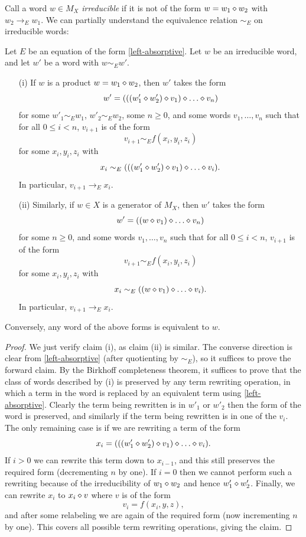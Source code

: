 Call a word $w \in M_X$ \emph{irreducible} if it is not of the form $w = w_1 \diamond w_2$ with $w_2 \to_E w_1$.  We can partially understand the equivalence relation $\sim_E$ on irreducible words:

\begin{theorem}\label{irred-desc}  Let $E$ be an equation of the form \eqref{left-absorptive}.  Let $w$ be an irreducible word, and let $w'$ be a word with $w \sim_E w'$.
  \begin{itemize}
    \item[(i)] If $w$ is a product $w = w_1 \diamond w_2$, then $w'$ takes the form
$$ w' = (((w'_1 \op w'_2) \op v_1) \op \dots \op v_n)$$
for some $w'_1 \sim_E w_1$, $w'_2 \sim_E w_2$, some $n \geq 0$, and some words $v_1, \dots, v_n$ such that for all $0 \leq i < n$, $v_{i+1}$ is of the form
$$ v_{i+1} \sim_E f(x_i,y_i,z_i)$$
for some $x_i, y_i, z_i$ with
$$ x_i \sim_E (((w'_1 \op w'_2) \op v_1) \op \dots \op v_i).$$
In particular, $v_{i+1} \to_E x_i$.
  \item[(ii)] Similarly, if $w \in X$ is a generator of $M_X$, then $w'$ takes the form
$$ w' = ((w \op v_1) \op \dots \op v_n)$$
for some $n \geq 0$, and some words $v_1, \dots, v_n$ such that for all $0 \leq i < n$, $v_{i+1}$ is of the form
$$ v_{i+1} \sim_E f(x_i,y_i,z_i)$$
for some $x_i, y_i, z_i$ with
$$ x_i \sim_E ((w \op v_1) \op \dots \op v_i).$$
In particular, $v_{i+1} \to_E x_i$.
\end{itemize}
Conversely, any word of the above forms is equivalent to $w$.
\end{theorem}

\begin{proof}  We just verify claim (i), as claim (ii) is similar.  The converse direction is clear from \eqref{left-absorptive} (after quotienting by $\sim_E$), so it suffices to prove the forward claim. By the Birkhoff completeness theorem, it suffices to prove that the class of words described by (i) is preserved by any term rewriting operation, in which a term in the word is replaced by an equivalent term using \eqref{left-absorptive}.  Clearly the term being rewritten is in $w'_1$ or $w'_2$ then the form of the word is preserved, and similarly if the term being rewritten is in one of the $v_i$.  The only remaining case is if we are rewriting a term of the form
$$ x_i = (((w'_1 \op w'_2) \op v_1) \op \dots \op v_i).$$
If $i>0$ we can rewrite this term down to $x_{i-1}$, and this still preserves the required form (decrementing $n$ by one).  If $i=0$ then we cannot perform such a rewriting because of the irreducibility of $w_1 \diamond w_2$ and hence $w'_1 \diamond w'_2$.  Finally, we can rewrite $x_i$ to $x_i \diamond v$ where $v$ is of the form
$$ v_i = f(x_i,y,z),$$
and after some relabeling we are again of the required form (now incrementing $n$ by one). This covers all possible term rewriting operations, giving the claim.
\end{proof}

